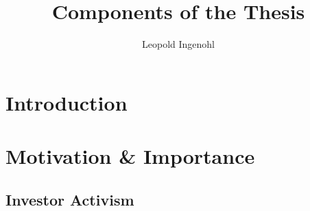 \documentclass[12pt]{article}
\title{Components of the Thesis}
\author{Leopold Ingenohl}
\begin{document}
\maketitle

\pagebreak

\tableofcontents

\pagebreak

\section{Introduction}


\section{Motivation \& Importance} 

\subsection{Investor Activism}
\end{document}
